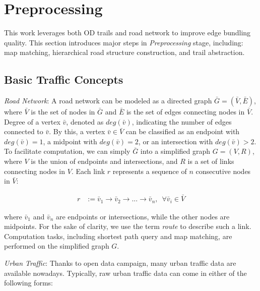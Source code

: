 \section{Preprocessing}
\label{sec:preprocess}

This work leverages both OD trails and road network to improve edge bundling quality.
This section introduces major steps in \textit{Preprocessing} stage, including: map matching, hierarchical road structure construction, and trail abstraction.

\subsection{Basic Traffic Concepts}
\textit{Road Network}:
A road network can be modeled as a directed graph $\bar{G} = (\bar{V}, \bar{E})$, where $\bar{V}$ is the set of nodes in $\bar{G}$ and $\bar{E}$ is the set of edges connecting nodes in $\bar{V}$.
Degree of a vertex $\bar{v}$, denoted as $deg(\bar{v})$, indicating the number of edges connected to $\bar{v}$.
By this, a vertex $\bar{v} \in \bar{V}$ can be classified as an endpoint with $deg(\bar{v})=1$, a midpoint with $deg(\bar{v})=2$, or an intersection with $deg(\bar{v})>2$.
To facilitate computation, we can simply $\bar{G}$ into a simplified graph $G = (V, R)$, where $V$ is the union of endpoints and intersections, and $R$ is a set of links connecting nodes in $V$.
Each link $r$ represents a sequence of $n$ consecutive nodes in $\bar{V}$:

\vspace{-7mm}
\begin{equation}
  \begin{aligned}
  	r &:= \bar{v}_1 \rightarrow \bar{v}_2 \rightarrow ... \rightarrow \bar{v}_n, \,\,\, \forall \bar{v}_i \in \bar{V}
  \end{aligned}
\end{equation}

\vspace{-2mm}
\noindent
where $\bar{v}_1$ and $\bar{v}_n$ are endpoints or intersections, while the other nodes are midpoints.
For the sake of clarity, we use the term \textit{route} to describe such a link.
Computation tasks, including shortest path query and map matching, are performed on the simplified graph $G$.

\vspace{1mm}
\noindent
\textit{Urban Traffic}:
Thanks to open data campaign, many urban traffic data are available nowadays.
Typically, raw urban traffic data can come in either of the following forms:

